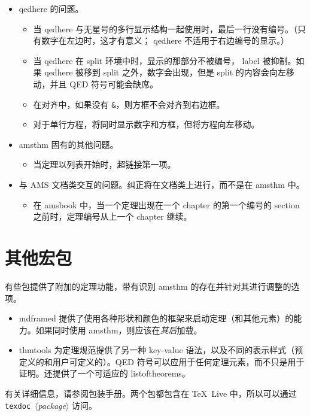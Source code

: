\documentclass{article}
\newcommand{\ntt}{%
  \fontfamily\ttdefault \fontseries\mddefault \fontshape\updefault
  \selectfont
}
\DeclareRobustCommand{\cn}[1]{{\ntt\bslchar#1}}
\DeclareRobustCommand{\cls}[1]{{\ntt#1}}
\DeclareRobustCommand{\pkg}[1]{{\ntt#1}}
\DeclareRobustCommand{\env}[1]{{\ntt#1}}
\def\<#1>{{\normalfont$\langle$\textit{#1}$\rangle$}}
\begin{document}
\begin{itemize}
\item \cn{qedhere} 的问题。 %
 \begin{itemize}
  \item 当 \cn{qedhere} 与无星号的多行显示结构一起使用时，最后一行没有编号。（只有数字在左边时，这才有意义；\cn{qedhere} 不适用于右边编号的显示。）
  \item 当 \cn{qedhere} 在 \env{split} 环境中时，显示的那部分不被编号，\cn{label} 被抑制。如果 \cn{qedhere} 被移到 \env{split} 之外，数字会出现，但是 \env{split} 的内容会向左移动，并且 QED 符号可能会缺席。
  \item 在对齐中，如果没有 \verb+&+，则方框不会对齐到右边框。
  \item 对于单行方程，将同时显示数字和方框，但将方程向左移动。
 \end{itemize}
\item \pkg{amsthm} 固有的其他问题。
 \begin{itemize}
  \item 当定理以列表开始时，超链接第一项。
 \end{itemize}
\item 与 AMS 文档类交互的问题。纠正将在文档类上进行，而不是在 \pkg{amsthm} 中。
 \begin{itemize}
  \item 在 \cls{amsbook} 中，当一个定理出现在一个 chapter 的第一个编号的 section 之前时，定理编号从上一个 chapter 继续。
 \end{itemize}
\end{itemize}


\section{其他宏包}

有些包提供了附加的定理功能，带有识别 \pkg{amsthm} 的存在并针对其进行调整的选项。
\begin{itemize}
\itemsep=.5\itemsep
\item \pkg{mdframed} \cite{MDF} 提供了使用各种形状和颜色的框架来启动定理（和其他元素）的能力。如果同时使用 \pkg{amsthm}，则应该在\emph{其后}加载。
\item \pkg{thmtools} \cite{THT} 为定理规范提供了另一种 key-value 语法，以及不同的表示样式（预定义的和用户可定义的）。QED 符号可以应用于任何定理元素，而不只是用于证明。还提供了一个可适应的 \cn{listoftheorems}。
\end{itemize}
有关详细信息，请参阅包装手册。两个包都包含在 \TeX~Live 中，所以可以通过 \texttt{texdoc}~\<package> 访问。
\end{document}
